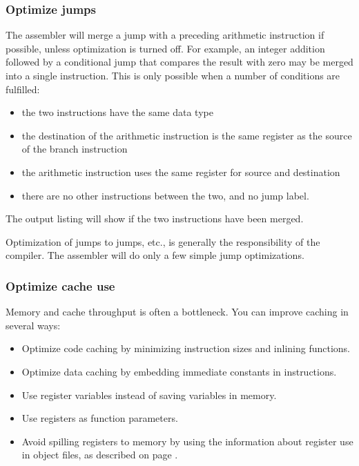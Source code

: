 \documentclass[forwardcom.tex]{subfiles}
\begin{document}
\subsubsection{Optimize jumps}
The assembler will merge a jump with a preceding arithmetic instruction if possible, unless optimization is turned off. For example, an integer addition followed by a conditional jump that compares the result with zero may be merged into a single instruction. This is only possible when a number of conditions are fulfilled: 
\begin{itemize}
\item the two instructions have the same data type
\item the destination of the arithmetic instruction is the same register as the source of the branch instruction
\item the arithmetic instruction uses the same register for source and destination
\item there are no other instructions between the two, and no jump label.
\end{itemize}

The output listing will show if the two instructions have been merged.
\vspace{2mm}

Optimization of jumps to jumps, etc., is generally the responsibility of the compiler. The assembler will do only a few simple jump optimizations.


\subsubsection{Optimize cache use}
Memory and cache throughput is often a bottleneck. You can improve caching 
in several ways:

\begin{itemize}
\item Optimize code caching by minimizing instruction sizes and inlining functions.
\item Optimize data caching by embedding immediate constants in instructions.
\item Use register variables instead of saving variables in memory.
\item Use registers as function parameters.
\item Avoid spilling registers to memory by using the information about register use in object files, as described on page \pageref{chap:registerUsageConvention}.
\end{itemize}
\end{document}
